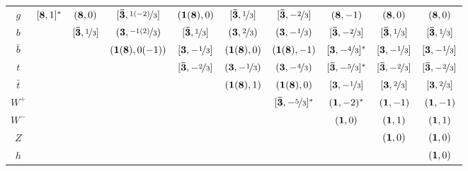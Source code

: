 \begin{table}
\begin{center}
\begin{tabular}{cccccccccc}
$g$ & $[\mathbf{8}, 1]^*$ & $(\mathbf{8}, 0)$ & $[\mathbf{\bar 3}, \nicefrac{1(-2)}{3}]$ & $(\mathbf{1(8)}, 0)$ & $[\mathbf{\bar 3}, \nicefrac{1}{3}]$ & $[\mathbf{\bar 3}, -\nicefrac{2}{3}]$ & $(\mathbf{8}, -1)$ &  $(\mathbf{8}, 0)$ &  $(\mathbf{8}, 0)$ \\ 
$b$ &  & $[\mathbf{\bar 3}, \nicefrac{1}{3}]$ & $(\mathbf{3}, \nicefrac{-1(2)}{3})$ & $[\mathbf{\bar 3}, \nicefrac{1}{3}]$ & $(\mathbf{3}, \nicefrac{2}{3})$ & $(\mathbf{3}, -\nicefrac{1}{3})$ & $[\mathbf{\bar 3}, -\nicefrac{2}{3}]$ & $[\mathbf{\bar 3}, \nicefrac{1}{3}]$ & $[\mathbf{\bar 3}, \nicefrac{1}{3}]$   \\  
$\bar b$ & & & $(\mathbf{1(8)}, 0(-1))$ & $[\mathbf{3}, -\nicefrac{1}{3}]$ & $(\mathbf{1(8)}, 0)$ & $(\mathbf{1(8)}, -1)$  & $[\mathbf{3}, -\nicefrac{4}{3}]^*$ & $[\mathbf{3}, -\nicefrac{1}{3}]$&  $[\mathbf{3}, -\nicefrac{1}{3}]$\\ 
$t$ & & &  & $[\mathbf{\bar 3}, -\nicefrac{2}{3}]$ & $(\mathbf{3}, -\nicefrac{1}{3})$ & $(\mathbf{3}, -\nicefrac{4}{3})$& $[\mathbf{\bar 3}, -\nicefrac{5}{3}]^*$ & $[\mathbf{\bar 3}, -\nicefrac{2}{3}]$ & $[\mathbf{\bar 3}, -\nicefrac{2}{3}]$  \\  
$\bar t$ & & & & & $(\mathbf{1(8)}, 1)$ & $(\mathbf{1(8)}, 0)$ & $[\mathbf{3}, -\nicefrac{1}{3}]$ & $[\mathbf{3}, \nicefrac{2}{3}]$& $[\mathbf{3}, \nicefrac{2}{3}]$  \\ 
$W^+$ & & &  & & & $[\mathbf{\bar 3}, -\nicefrac{5}{3}]^*$ & $(\mathbf{1}, -2)^*$ & $(\mathbf{1}, -1)$ & $(\mathbf{1}, -1)$ \\ 
$W^-$ & & & & & & & $(\mathbf{1}, 0)$& $(\mathbf{1}, 1)$& $(\mathbf{1}, 1)$  \\ 
$Z$ & & & & & & & & $(\mathbf{1}, 0)$ & $(\mathbf{1}, 0)$  \\  
$h$ & & & & & & & & & $(\mathbf{1}, 0)$  \\  \hline\hline

\end{tabular}
\end{center}
\label{default}
\end{table}


